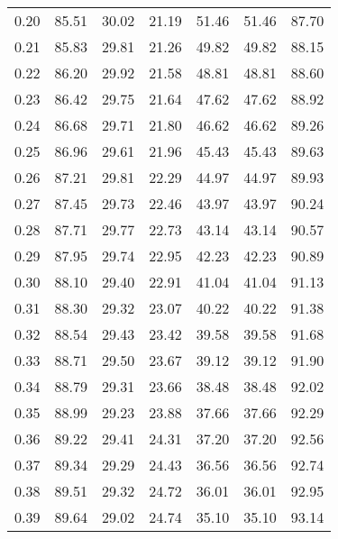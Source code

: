 \begin{tabular}{|c|c|c|c|c|c|c|}
      0.20 &     85.51 &     30.02 &      21.19 &   51.46 &      51.46 &         87.70 \\
      0.21 &     85.83 &     29.81 &      21.26 &   49.82 &      49.82 &         88.15 \\
      0.22 &     86.20 &     29.92 &      21.58 &   48.81 &      48.81 &         88.60 \\
      0.23 &     86.42 &     29.75 &      21.64 &   47.62 &      47.62 &         88.92 \\
      0.24 &     86.68 &     29.71 &      21.80 &   46.62 &      46.62 &         89.26 \\
      0.25 &     86.96 &     29.61 &      21.96 &   45.43 &      45.43 &         89.63 \\
      0.26 &     87.21 &     29.81 &      22.29 &   44.97 &      44.97 &         89.93 \\
      0.27 &     87.45 &     29.73 &      22.46 &   43.97 &      43.97 &         90.24 \\
      0.28 &     87.71 &     29.77 &      22.73 &   43.14 &      43.14 &         90.57 \\
      0.29 &     87.95 &     29.74 &      22.95 &   42.23 &      42.23 &         90.89 \\
      0.30 &     88.10 &     29.40 &      22.91 &   41.04 &      41.04 &         91.13 \\
      0.31 &     88.30 &     29.32 &      23.07 &   40.22 &      40.22 &         91.38 \\
      0.32 &     88.54 &     29.43 &      23.42 &   39.58 &      39.58 &         91.68 \\
      0.33 &     88.71 &     29.50 &      23.67 &   39.12 &      39.12 &         91.90 \\
      0.34 &     88.79 &     29.31 &      23.66 &   38.48 &      38.48 &         92.02 \\
      0.35 &     88.99 &     29.23 &      23.88 &   37.66 &      37.66 &         92.29 \\
      0.36 &     89.22 &     29.41 &      24.31 &   37.20 &      37.20 &         92.56 \\
      0.37 &     89.34 &     29.29 &      24.43 &   36.56 &      36.56 &         92.74 \\
      0.38 &     89.51 &     29.32 &      24.72 &   36.01 &      36.01 &         92.95 \\
      0.39 &     89.64 &     29.02 &      24.74 &   35.10 &      35.10 &         93.14 \\

\end{tabular}
